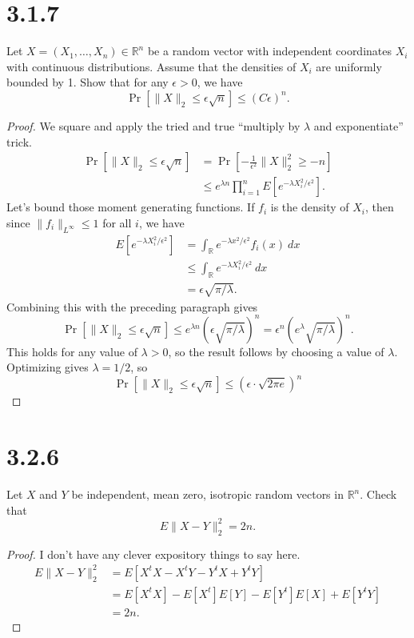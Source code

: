 \documentclass[11pt,letterpaper]{report}
\newcommand{\reals}{\mathbb{R}}
\newcommand{\Lp}[2]{\big\|{#1}\big\|_{L^{#2}}}
\begin{document}
\section*{3.1.7}
Let $X = (X_1, \ldots, X_n)\in \reals^n$ be a random vector with independent coordinates $X_i$ with continuous distributions. Assume that the densities of $X_i$ are uniformly bounded by 1. Show that for any $\epsilon>0$, we have
\[
\Pr[\|X\|_2 \leq \epsilon \sqrt{n}] \leq (C\epsilon)^n.
\]
\begin{proof}
	We square and apply the tried and true ``multiply by $\lambda$ and exponentiate'' trick.
	\begin{align*}
		\Pr[\|X\|_2 \leq \epsilon \sqrt{n}] &= \Pr\left[-\frac{1}{\epsilon^2}\|X\|_2^2 \geq -n\right]\\
		&\leq e^{\lambda n}\prod_{i=1}^nE\left[ e^{-\lambda X_i^2/\epsilon^2}\right].
	\end{align*}
	Let's bound those moment generating functions. If $f_i$ is the density of $X_i$, then since $\Lp{f_i}{\infty}\leq 1$ for all $i$, we have
	\begin{align*}
		E\left[e^{-\lambda X_i^2/\epsilon^2}\right] &= \int_\reals e^{-\lambda x^2/\epsilon^2}f_i(x)\ dx\\
		&\leq \int_\reals e^{-\lambda X_i^2/\epsilon^2}\ dx\\
		&= \epsilon\sqrt{\pi/\lambda}.
	\end{align*}
	Combining this with the preceding paragraph gives
	\[
	\Pr[\|X\|_2 \leq \epsilon\sqrt{n}] \leq e^{\lambda n}(\epsilon \sqrt{\pi/\lambda})^n = \epsilon^n(e^\lambda \sqrt{\pi/\lambda})^n.
	\]
	This holds for any value of $\lambda >0$, so the result follows by choosing a value of $\lambda$. Optimizing gives $\lambda = 1/2$, so
	\[
		\Pr[\|X\|_2 \leq \epsilon\sqrt{n}] \leq (\epsilon\cdot \sqrt{2\pi e})^n
	\]
\end{proof}










\section*{3.2.6}
Let $X$ and $Y$ be independent, mean zero, isotropic random vectors in $\reals^n$. Check that
\[
E\|X-Y\|_2^2 = 2n.
\]
\begin{proof}
	I don't have any clever expository things to say here.
	\begin{align*}
		E\|X-Y\|_2^2 &= E[X^tX - X^tY - Y^tX + Y^tY]\\
		&= E[X^tX] - E[X^t]E[Y] - E[Y^t]E[X] + E[Y^tY]\\
		&= 2n.
	\end{align*}
\end{proof}
\end{document}
